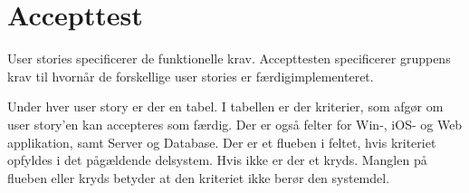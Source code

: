 \chapter{Accepttest}


User stories specificerer de funktionelle krav. Accepttesten specificerer gruppens krav til hvornår de forskellige user stories er færdigimplementeret. 

Under hver user story er der en tabel. I tabellen er der kriterier, som afgør om user story'en kan accepteres som færdig. Der er også felter for Win-, iOS- og Web applikation, samt Server og Database. Der er et flueben i feltet, hvis kriteriet opfyldes i det pågældende delsystem.
Hvis ikke er der et kryds. Manglen på flueben eller kryds betyder at den kriteriet ikke berør den systemdel.
